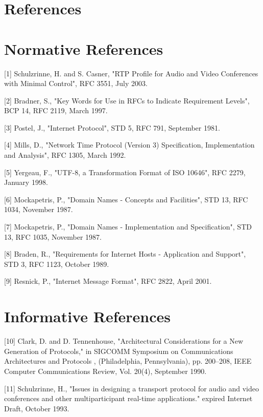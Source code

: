 \documentclass{article}
\begin{document}
\section*{References}

\section*{Normative References}

[1]  Schulzrinne, H. and S. Casner, "RTP Profile for Audio and Video Conferences with Minimal Control", RFC 3551, July 2003.

[2]  Bradner, S., "Key Words for Use in RFCs to Indicate Requirement Levels", BCP 14, RFC 2119, March 1997.

[3]  Postel, J., "Internet Protocol", STD 5, RFC 791, September 1981.

[4]  Mills, D., "Network Time Protocol (Version 3) Specification, Implementation and Analysis", RFC 1305, March 1992.

[5]  Yergeau, F., "UTF-8, a Transformation Format of ISO 10646", RFC 2279, January 1998.

[6]  Mockapetris, P., "Domain Names - Concepts and Facilities", STD 13, RFC 1034, November 1987.

[7]  Mockapetris, P., "Domain Names - Implementation and Specification", STD 13, RFC 1035, November 1987.

[8]  Braden, R., "Requirements for Internet Hosts - Application and Support", STD 3, RFC 1123, October 1989.

[9]  Resnick, P., "Internet Message Format", RFC 2822, April 2001.

\section*{Informative References}

[10] Clark, D. and D. Tennenhouse, "Architectural Considerations for a New Generation of Protocols," in SIGCOMM Symposium on Communications Architectures and Protocols , (Philadelphia, Pennsylvania), pp. 200--208, IEEE Computer Communications Review, Vol. 20(4), September 1990.

[11] Schulzrinne, H., "Issues in designing a transport protocol for audio and video conferences and other multiparticipant real-time applications." expired Internet Draft, October 1993.
\end{document}
